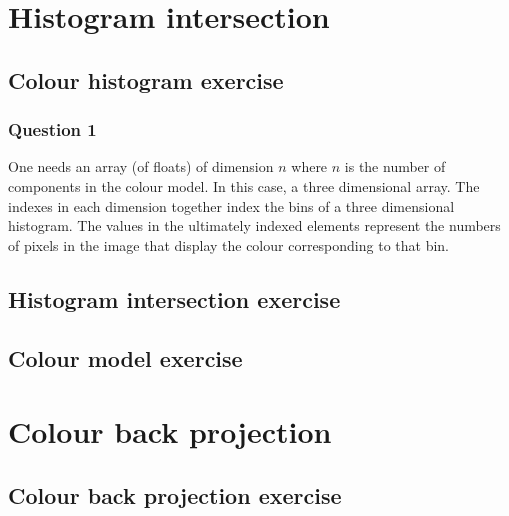 \documentclass[abstract=true]{scrartcl}
\title{}
\author{Joris Stork, Lucas Swartsenburg}
\begin{document}
\maketitle


\section{Histogram intersection}

    \subsection{Colour histogram exercise}

        \subsubsection{Question 1}

            One needs an array (of floats) of dimension $n$ where $n$ is the
            number of components in the colour model. In this case, a three
            dimensional array. The indexes in each dimension together index the
            bins of a three dimensional histogram. The values in the ultimately
            indexed elements represent the numbers of pixels in the image that
            display the colour corresponding to that bin. 

\subsection{Histogram intersection exercise}

\subsection{Colour model exercise}


\section{Colour back projection}

\subsection{Colour back projection exercise}
\end{document}
